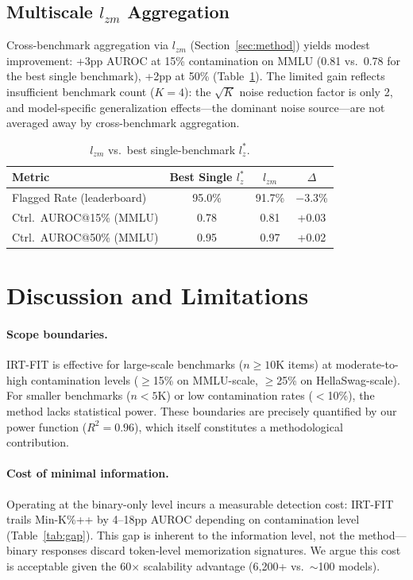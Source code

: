 \documentclass[11pt,a4paper]{article}
\begin{document}
\subsection{Multiscale $l_{zm}$ Aggregation}
\label{sec:lzm}

Cross-benchmark aggregation via $l_{zm}$ (Section~\ref{sec:method}) yields modest improvement: +3pp AUROC at 15\% contamination on MMLU (0.81 vs.\ 0.78 for the best single benchmark), +2pp at 50\% (Table~\ref{tab:lzm}). The limited gain reflects insufficient benchmark count ($K=4$): the $\sqrt{K}$ noise reduction factor is only 2, and model-specific generalization effects---the dominant noise source---are not averaged away by cross-benchmark aggregation.

\begin{table}[t]
\centering
\small
\caption{$l_{zm}$ vs.\ best single-benchmark $l_z^*$.}
\label{tab:lzm}
\begin{tabular}{lccc}
\toprule
Metric & Best Single $l_z^*$ & $l_{zm}$ & $\Delta$ \\
\midrule
Flagged Rate (leaderboard) & 95.0\% & 91.7\% & $-$3.3\% \\
Ctrl.\ AUROC@15\% (MMLU) & 0.78 & 0.81 & +0.03 \\
Ctrl.\ AUROC@50\% (MMLU) & 0.95 & 0.97 & +0.02 \\
\bottomrule
\end{tabular}
\end{table}


\section{Discussion and Limitations}
\label{sec:discussion}

\paragraph{Scope boundaries.}
IRT-FIT is effective for large-scale benchmarks ($n \geq 10$K items) at moderate-to-high contamination levels ($\geq$15\% on MMLU-scale, $\geq$25\% on HellaSwag-scale). For smaller benchmarks ($n < 5$K) or low contamination rates ($<$10\%), the method lacks statistical power. These boundaries are precisely quantified by our power function ($R^2=0.96$), which itself constitutes a methodological contribution.

\paragraph{Cost of minimal information.}
Operating at the binary-only level incurs a measurable detection cost: IRT-FIT trails Min-K\%++ by 4--18pp AUROC depending on contamination level (Table~\ref{tab:gap}). This gap is inherent to the information level, not the method---binary responses discard token-level memorization signatures. We argue this cost is acceptable given the 60$\times$ scalability advantage (6{,}200+ vs.\ ${\sim}$100 models).
\end{document}
